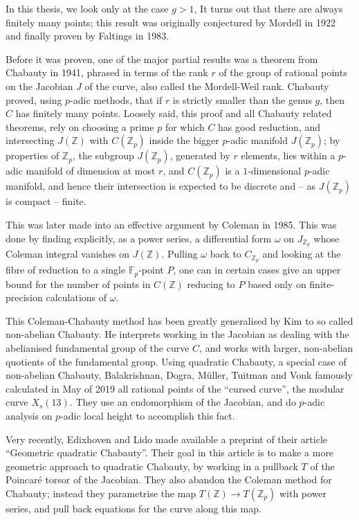 \documentclass[12pt]{article}
\newcommand{\Z}{\mathbb{Z}}
\newcommand{\F}{\mathbb{F}}
\theoremstyle{plain}
\theoremstyle{definition}
\theoremstyle{remark}
\begin{document}
In this thesis, we look only at the case $g > 1$, It turns out that there are always finitely many points; this result was originally conjectured by Mordell in 1922 and finally proven by Faltings in 1983.

Before it was proven, one of the major partial results was a theorem from Chabauty in 1941, phrased in terms of the rank $r$ of the group of rational points on the Jacobian $J$ of the curve, also called the Mordell-Weil rank. Chabauty proved, using $p$-adic methods, that if $r$ is strictly smaller than the genus $g$, then $C$ has finitely many points. Loosely said, this proof and all Chabauty related theorems, rely on choosing a prime $p$ for which $C$ has good reduction, and intersecting $J(\Z)$ with $C(\Z_p)$ inside the bigger $p$-adic manifold $J(\Z_p)$; by properties of $\Z_p$, the subgroup $J(\Z_p)$, generated by $r$ elements, lies within a $p$-adic manifold of dimension at most $r$, and $C(\Z_p)$ is a $1$-dimensional $p$-adic manifold, and hence their intersection is expected to be discrete and -- as $J(\Z_p)$ is compact -- finite.

This was later made into an effective argument by Coleman in 1985. This was done by finding explicitly, as a power series, a differential form $\omega$ on $J_{\Z_p}$ whose Coleman integral vanishes on $J(\Z)$. Pulling $\omega$ back to $C_{\Z_p}$ and looking at the fibre of reduction to a single $\F_p$-point $P$, one can in certain cases give an upper bound for the number of points in $C(\Z)$ reducing to $P$ based only on finite-precision calculations of $\omega$.

This Coleman-Chabauty method has been greatly generalised by Kim to so called non-abelian Chabauty. He interprets working in the Jacobian as dealing with the abelianised fundamental group of the curve $C$, and works with larger, non-abelian quotients of the fundamental group. Using quadratic Chabauty, a special case of non-abelian Chabauty, Balakrishnan, Dogra, M\"uller, Tuitman and Vonk famously calculated in May of 2019 all rational points of the ``cursed curve'', the modular curve $X_s(13)$. They use an endomorphism of the Jacobian, and do $p$-adic analysis on $p$-adic local height to accomplish this fact. 

Very recently, Edixhoven and Lido made available a preprint of their article ``Geometric quadratic Chabauty''. Their goal in this article is to make a more geometric approach to quadratic Chabauty, by working in a pullback $T$ of the Poincar\'e torsor of the Jacobian. They also abandon the Coleman method for Chabauty; instead they parametrise the map $T(\Z) \to T(\Z_p)$ with power series, and pull back equations for the curve along this map. 
\end{document}

